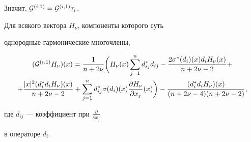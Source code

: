 Значит, ${\cal G}^{(i,1)}={\cal G}^{(i,1)} \tau_i$.








\begin{lem} \label{l.MHnu}


Для всякого вектора $H_\nu$, компоненты которого суть


однородные гармонические многочлены,


\begin{multline}


({\cal G}^{(i,1)} H_\nu) (x) =


\frac{1}{n+2\nu} \bigg(H_\nu (x)


\sum_{j=1}^n d_{ij}^* d_{ij}


- \frac{2 \sigma ^* (d_i) (x) d_i H_\nu (x)}{n+2\nu -2}+\\


%


\label{eq.MA}


+\frac{|x|^2 (d^*_i d_i H_\nu) (x)}{n+2\nu -2}+\sum_{j=1}^n


d_{ij}^* \sigma (d_i) (x) \frac{\partial H_\nu}{\partial x_ j} (x)


\bigg)- \frac{(d^*_i d_i H_\nu)(x)}{(n+2\nu-4)(n+2\nu -2)},


\end{multline}


где $d_{ij}$ --- коэффициент при $\frac{\partial }{\partial x_j}$


в операторе $d_i$.


\end{lem}








